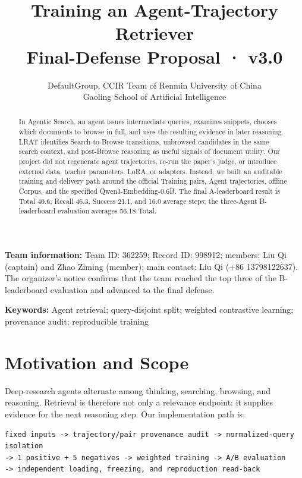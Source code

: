 \documentclass[10pt,a4paper]{article}
\title{\bfseries Training an Agent-Trajectory Retriever\\[-1mm]\large Final-Defense Proposal · v3.0}
\author{DefaultGroup, CCIR Team of Renmin University of China\\Gaoling School of Artificial Intelligence}
\date{}
\begin{document}
\maketitle
\vspace{-7pt}
\noindent\footnotesize
\textbf{Team information:} Team ID: 362259; Record ID: 998912; members: Liu Qi (captain) and Zhao Ziming (member); main contact: Liu Qi (+86 13798122637). The organizer's notice confirms that the team reached the top three of the B-leaderboard evaluation and advanced to the final defense.\par
\vspace{-2pt}

\begin{abstract}
In Agentic Search, an agent issues intermediate queries, examines snippets, chooses which documents to browse in full, and uses the resulting evidence in later reasoning. LRAT identifies Search-to-Browse transitions, unbrowsed candidates in the same search context, and post-Browse reasoning as useful signals of document utility. Our project did not regenerate agent trajectories, re-run the paper's judge, or introduce external data, teacher parameters, LoRA, or adapters. Instead, we built an auditable training and delivery path around the official Training pairs, Agent trajectories, offline Corpus, and the specified Qwen3-Embedding-0.6B. The final A-leaderboard result is Total 40.6, Recall 46.3, Success 21.1, and 16.0 average steps; the three-Agent B-leaderboard evaluation averages 56.18 Total.
\end{abstract}

\noindent\textbf{Keywords:} Agent retrieval; query-disjoint split; weighted contrastive learning; provenance audit; reproducible training

\section{Motivation and Scope}
Deep-research agents alternate among thinking, searching, browsing, and reasoning. Retrieval is therefore not only a relevance endpoint: it supplies evidence for the next reasoning step. Our implementation path is:

\begin{lstlisting}
fixed inputs -> trajectory/pair provenance audit -> normalized-query isolation
-> 1 positive + 5 negatives -> weighted training -> A/B evaluation
-> independent loading, freezing, and reproduction read-back
\end{lstlisting}
\end{document}
